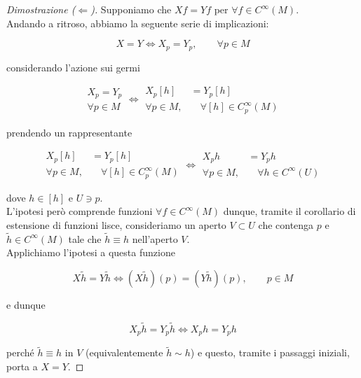 \begin{proof}[Dimostrazione ($ \Longleftarrow $)]
	Supponiamo che $ X f = Y f $ per $ \forall f \in C^{\infty}(M) $.\\
	Andando a ritroso, abbiamo la seguente serie di implicazioni:
	
	\begin{equation}
		X = Y \iff X_{p} = Y_{p}, \qquad \forall p \in M
	\end{equation}

	considerando l'azione sui germi
	
	\begin{equation}
		\begin{aligned}
			X_{p} = Y_{p}\\
			\forall p \in M
		\end{aligned}%
		 \iff %
		 \begin{aligned}
			 X_{p} [h] &= Y_{p} [h]\\
			 \forall p \in M,& \quad \forall [h] \in C_{p}^{\infty}(M)
		 \end{aligned}
	\end{equation}

	prendendo un rappresentante
	
	\begin{equation}
		\begin{aligned}
			X_{p} [h] &= Y_{p} [h]\\
			\forall p \in M,& \quad \forall [h] \in C_{p}^{\infty}(M)
		\end{aligned}%
		\iff %
		\begin{aligned}
			X_{p} h &= Y_{p} h\\
			\forall p \in M,& \quad \forall h \in C^{\infty}(U)
		\end{aligned}
	\end{equation}
	
	dove $ h \in [h] $ e $ U \ni p $.\\
	L'ipotesi però comprende funzioni $ \forall f \in C^{\infty}(M) $ dunque, tramite il corollario di estensione di funzioni lisce, consideriamo un aperto $ V \subset U $ che contenga $ p $ e $ \tilde{h} \in C^{\infty}(M) $ tale che $ \tilde{h} \equiv h $ nell'aperto $ V $.\\
	Applichiamo l'ipotesi a questa funzione
	
	\begin{equation}
		X \tilde{h} = Y \tilde{h} \iff (X \tilde{h})(p) = (Y \tilde{h})(p), \qquad p \in M
	\end{equation}

	e dunque
	
	\begin{equation}
		X_{p} \tilde{h} = Y_{p} \tilde{h} \iff X_{p} h = Y_{p} h
	\end{equation}

	perché $ \tilde{h} \equiv h $ in $ V $ (equivalentemente $ \tilde{h} \sim h $) e questo, tramite i passaggi iniziali, porta a $ X = Y $.
\end{proof}

